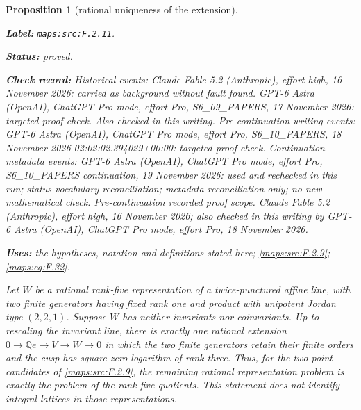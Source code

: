 \documentclass[11pt,a4paper]{article}
\newtheorem{proposition}[proposition]{Proposition}
\theoremstyle{definition}
\newcommand{\StatementRecord}[4]{\par\smallskip\begingroup\upshape\raggedright\noindent\textbf{Label:} \nolinkurl{#1}.\par\noindent\textbf{Status:} #2.\par\noindent\textbf{Check record:} #3.\par\noindent\textbf{Uses:} #4.\par\endgroup\smallskip}
\begin{document}
\begin{proposition}[rational uniqueness of the extension]\label{maps:src:F.2.11}
\StatementRecord{maps:src:F.2.11}{proved}{Historical events: Claude Fable 5.2 (Anthropic), effort high, 16 November 2026: carried as background without fault found. GPT-6 Astra (OpenAI), ChatGPT Pro mode, effort Pro, S6\_09\_PAPERS, 17 November 2026: targeted proof check. Also checked in this writing. Pre-continuation writing events: GPT-6 Astra (OpenAI), ChatGPT Pro mode, effort Pro, S6\_10\_PAPERS, 18 November 2026 02:02:02.394029+00:00: targeted proof check. Continuation metadata events: GPT-6 Astra (OpenAI), ChatGPT Pro mode, effort Pro, S6\_10\_PAPERS continuation, 19 November 2026: used and rechecked in this run; status-vocabulary reconciliation; metadata reconciliation only; no new mathematical check. \emph{Pre-continuation recorded proof scope.} Claude Fable 5.2 (Anthropic), effort high, 16 November 2026; also checked in this writing by GPT-6 Astra (OpenAI), ChatGPT Pro mode, effort Pro, 18 November 2026}{the hypotheses, notation and definitions stated here; \cref{maps:src:F.2.9}; \cref{maps:eq:F.32}}


Let $W$ be a rational rank-five representation of a
twice-punctured affine line, with two finite generators
having fixed rank one and product with unipotent Jordan type
$(2,2,1)$.  Suppose $W$ has neither invariants nor
coinvariants.  Up to rescaling the invariant line, there is
exactly one rational extension
$0\to\mathbb Qe\to V\to W\to0$ in which the two finite
generators retain their finite orders and the cusp has
square-zero logarithm of rank three.  Thus, for the
two-point candidates of \ref{maps:src:F.2.9}, the remaining rational
representation problem is exactly the problem of the
rank-five quotients.  This statement does not identify
integral lattices in those representations.

\end{proposition}
\end{document}
